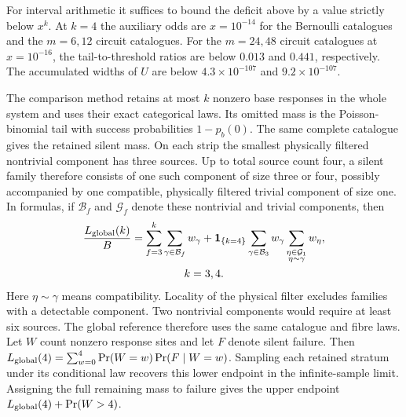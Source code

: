\documentclass[10pt,twocolumn]{article}
\theoremstyle{definition}
\begin{document}
For interval arithmetic it suffices to bound the deficit above by
a value strictly below $x^k$. At $k=4$ the auxiliary odds are
$x=10^{-14}$ for the Bernoulli catalogues and the $m=6,12$ circuit
catalogues. For the $m=24,48$ circuit catalogues at $x=10^{-16}$,
the tail-to-threshold ratios are below $0.013$ and $0.441$,
respectively. The accumulated widths of $U$ are below
$4.3\times10^{-107}$ and $9.2\times10^{-107}$.

The comparison method retains at most $k$ nonzero base responses in
the whole system and uses their exact categorical laws. Its omitted
mass is the Poisson-binomial tail with success probabilities
$1-p_b(0)$. The same complete catalogue gives the retained silent
mass. On each strip the smallest physically filtered nontrivial
component has three sources. Up to total source count four, a silent family
therefore consists of one such component of size three or four, possibly
accompanied by one compatible, physically filtered trivial component
of size one. In formulas, if $\mathcal B_f$ and $\mathcal G_f$ denote
these nontrivial and trivial components, then
\begin{equation}\label{eq:strip-global-reference}
\begin{gathered}
 \frac{L_{\rm global}(k)}{B}
 =\sum_{f=3}^k\sum_{\gamma\in\mathcal B_f}w_\gamma
 +\mathbf1_{\{k=4\}}
   \sum_{\gamma\in\mathcal B_3}w_\gamma
   \sum_{\substack{\eta\in\mathcal G_1\\\eta\sim\gamma}}w_\eta,
 \\ k=3,4.
\end{gathered}
\end{equation}
Here $\eta\sim\gamma$ means compatibility. Locality of the physical
filter excludes families with a detectable component. Two nontrivial
components would require at least six sources. The global reference
therefore uses the same catalogue and fibre laws. Let $W$ count
nonzero response sites and let $F$ denote silent failure. Then
$L_{\rm global}(4)=\sum_{w=0}^4\Pr(W=w)\Pr(F\mid W=w)$.
Sampling each retained stratum under its conditional law recovers
this lower endpoint in the infinite-sample limit. Assigning the full
remaining mass to failure gives the upper endpoint
$L_{\rm global}(4)+\Pr(W>4)$.
\end{document}
